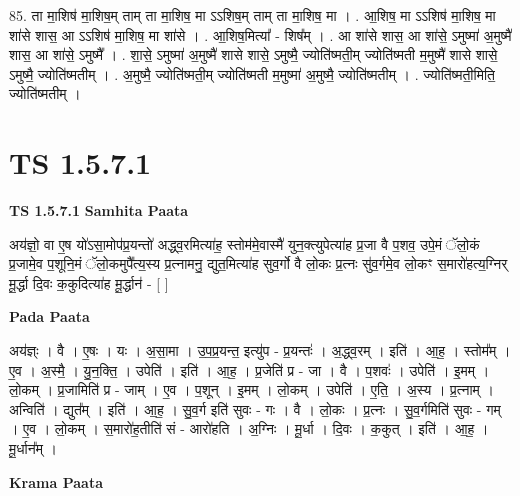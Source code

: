 \documentclass[17pt]{extarticle}
\begin{document}
85. ता मा॒शिष॑ मा॒शिष॒म् ताम् ता मा॒शिष॒ मा ऽऽशिष॒म् ताम् ता मा॒शिष॒ मा । . आ॒शिष॒ मा ऽऽशिष॑ मा॒शिष॒ मा शा॑से शास॒ आ ऽऽशिष॑ मा॒शिष॒ मा शा॑से । . आ॒शिष॒मित्या᳚ - शिष᳚म् । . आ शा॑से शास॒ आ शा॑से॒ ऽमुष्मा॑ अ॒मुष्मै॑ शास॒ आ शा॑से॒ ऽमुष्मै᳚ । . शा॒से॒ ऽमुष्मा॑ अ॒मुष्मै॑ शासे शासे॒ ऽमुष्मै॒ ज्योति॑ष्मती॒म् ज्योति॑ष्मती म॒मुष्मै॑ शासे शासे॒ ऽमुष्मै॒ ज्योति॑ष्मतीम् । . अ॒मुष्मै॒ ज्योति॑ष्मती॒म् ज्योति॑ष्मती म॒मुष्मा॑ अ॒मुष्मै॒ ज्योति॑ष्मतीम् । . ज्योति॑ष्मती॒मिति॒ ज्योति॑ष्मतीम् । \newline
\pagebreak
{}
\section*{ TS 1.5.7.1 }

\textbf{TS 1.5.7.1 } \newline
\textbf{Samhita Paata} \newline

अय॑ज्ञो॒ वा ए॒ष यो॑ऽसा॒मोप॑प्र॒यन्तो॑ अद्ध्व॒रमित्या॑ह॒ स्तोम॑मे॒वास्मै॑ युन॒क्त्युपेत्या॑ह प्र॒जा वै प॒शव॒ उपे॒मं ॅलो॒कं प्र॒जामे॒व प॒शूनि॒मं ॅलो॒कमुपै᳚त्य॒स्य प्र॒त्नामनु॒ द्युत॒मित्या॑ह सुव॒र्गो वै लो॒कः प्र॒त्नः सु॑व॒र्गमे॒व लो॒कꣳ स॒मारो॑हत्य॒ग्निर् मू॒र्द्धा दि॒वः क॒कुदित्या॑ह मू॒र्द्धान॑ - [ ] \newline

\textbf{Pada Paata} \newline

अय॑ज्ञ्ः । वै । ए॒षः । यः । अ॒सा॒मा । उ॒प॒प्र॒यन्त॒ इत्यु॑प - प्र॒यन्तः॑ । अ॒द्ध्व॒रम् । इति॑ । आ॒ह॒ । स्तोम᳚म् । ए॒व । अ॒स्मै॒ । यु॒न॒क्ति॒ । उपेति॑ । इति॑ । आ॒ह॒ । प्र॒जेति॑ प्र - जा । वै । प॒शवः॑ । उपेति॑ । इ॒मम् । लो॒कम् । प्र॒जामिति॑ प्र - जाम् । ए॒व । प॒शून् । इ॒मम् । लो॒कम् । उपेति॑ । ए॒ति॒ । अ॒स्य । प्र॒त्नाम् । अन्विति॑ । द्युत᳚म् । इति॑ । आ॒ह॒ । सु॒व॒र्ग इति॑ सुवः - गः । वै । लो॒कः । प्र॒त्नः । सु॒व॒र्गमिति॑ सुवः - गम् । ए॒व । लो॒कम् । स॒मारो॑ह॒तीति॑ सं - आरो॑हति । अ॒ग्निः । मू॒र्धा । दि॒वः । क॒कुत् । इति॑ । आ॒ह॒ । मू॒र्धान᳚म् ।  \newline


\textbf{Krama Paata} \newline
\end{document}
